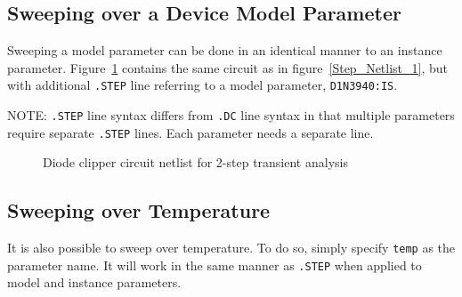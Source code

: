 \subsection{Sweeping over a Device Model Parameter}
\label{step_ModelParam}

Sweeping a model parameter can be done in an identical manner to an instance parameter.  Figure~\ref{Step_Netlist_2} contains the same circuit as in figure~\ref{Step_Netlist_1}, but with additional \verb|.STEP| line referring to a model parameter, \verb|D1N3940:IS|.  

NOTE:	\verb|.STEP| line syntax differs from \verb|.DC| line syntax in that multiple parameters require separate \verb|.STEP| lines. Each parameter needs a separate line.

\begin{figure}[htbp]
\begin{centering}
\caption{Diode clipper circuit netlist for 2-step transient
analysis\label{Step_Netlist_2}}
\end{centering}
\end{figure}

\subsection{Sweeping over Temperature}
\label{step_Temperature}

It is also possible to sweep over temperature.  To do so, simply 
specify \verb|temp| as the parameter name.  It will work in the 
same manner as \verb|.STEP| when applied to model and instance 
parameters.

